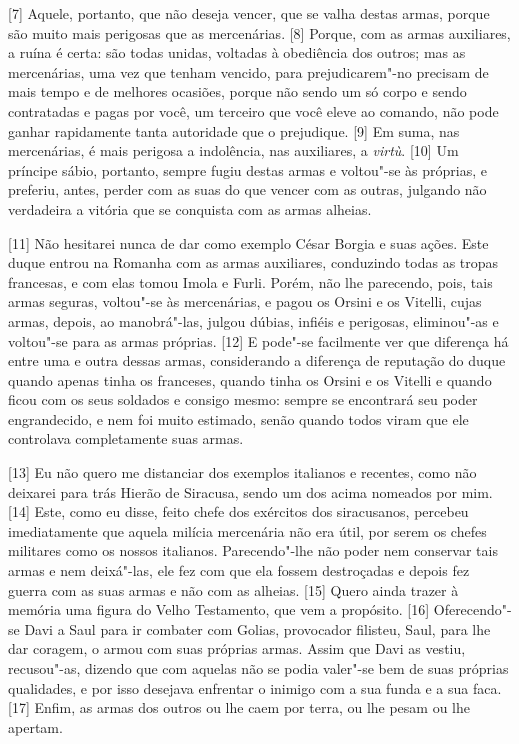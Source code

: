 {[}7{]} Aquele, portanto, que não deseja vencer, que se valha destas
armas, porque são muito mais perigosas que as mercenárias. {[}8{]}
Porque, com as armas auxiliares, a ruína é certa: são todas unidas,
voltadas à obediência dos outros; mas as mercenárias, uma vez que tenham
vencido, para prejudicarem"-no precisam de mais tempo e de melhores
ocasiões, porque não sendo um só corpo e sendo contratadas e pagas por
você, um terceiro que você eleve ao comando, não pode ganhar rapidamente
tanta autoridade que o prejudique. {[}9{]} Em suma, nas mercenárias, é
mais perigosa a indolência, nas auxiliares, a \emph{virtù}. {[}10{]} Um
príncipe sábio, portanto, sempre fugiu destas armas e voltou"-se às
próprias, e preferiu, antes, perder com as suas do que vencer com as
outras, julgando não verdadeira a vitória que se conquista com as armas
alheias.

{[}11{]} Não hesitarei nunca de dar como exemplo César Borgia e suas
ações. Este duque entrou na Romanha com as armas auxiliares, conduzindo
todas as tropas francesas, e com elas tomou Imola e Furli. Porém, não
lhe parecendo, pois, tais armas seguras, voltou"-se às mercenárias, e
pagou os Orsini e os Vitelli, cujas armas, depois, ao manobrá"-las,
julgou dúbias, infiéis e perigosas, eliminou"-as e voltou"-se para as
armas próprias. {[}12{]} E pode"-se facilmente ver que diferença há entre
uma e outra dessas armas, considerando a diferença de reputação do duque
quando apenas tinha os franceses, quando tinha os Orsini e os Vitelli e
quando ficou com os seus soldados e consigo mesmo: sempre se encontrará
seu poder engrandecido, e nem foi muito estimado, senão quando todos
viram que ele controlava completamente suas armas.

{[}13{]} Eu não quero me distanciar dos exemplos italianos e recentes,
como não deixarei para trás Hierão de Siracusa, sendo um dos acima
nomeados por mim. {[}14{]} Este, como
eu disse, feito chefe dos exércitos dos siracusanos, percebeu
imediatamente que aquela milícia mercenária não era útil, por serem os
chefes militares como os nossos italianos. Parecendo"-lhe não poder nem
conservar tais armas e nem deixá"-las, ele fez com que ela fossem
destroçadas e depois fez guerra com as suas armas e não com as alheias.
{[}15{]} Quero ainda trazer à memória uma figura do Velho Testamento,
que vem a propósito. {[}16{]} Oferecendo"-se Davi a Saul para ir combater
com Golias, provocador filisteu, Saul, para
lhe dar coragem, o armou com suas próprias armas. Assim que Davi as
vestiu, recusou"-as, dizendo que com aquelas não se podia valer"-se bem de
suas próprias qualidades, e por isso desejava enfrentar o inimigo com a
sua funda e a sua faca. {[}17{]} Enfim, as armas dos outros ou lhe caem
por terra, ou lhe pesam ou lhe apertam.

